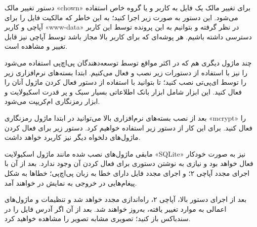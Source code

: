 دستور تغییر مالک «chown» برای تغییر مالک یک فایل به کاربر و یا گروه خاص استفاده می‌شود. این دستور به صورت زیر اجرا کنید؛ به این خاطر که مالکیت فایل را برای آپاچی و کاربر «www-data» در نظر گرفته و بتوانیم به این پرونده توسط این کاربر دسترسی داشته باشیم. هر پوشه‌ای که برای کاربر بالا مجاز باشد توسط آپاچی نیز قابل تغییر و مشاهده است.
\newline
\begin{latin}  
    
\end{latin}
چند ماژول دیگری هم که در اکثر مواقع توسط توسعه‌دهندگان پی‌اچ‌پی استفاده می‌شود را نیز با استفاده از دستورات زیر نصب و فعال می‌کنیم. ابتدا بسته‌های نرم‌افزاری زیر را توسط ای‌پی‌تی نصب کنید؛ تا بتوانید با استفاده از دستور فعال کردن ماژول آنان را فعال کنید. این ابزار شامل ابزار بانک اطلاعاتی بسیار سبک و پر قدرت اسکیو‌لایت و ابزار رمزنگاری ام‌کریپت می‌شود.
\newline
\begin{latin}  
    
\end{latin}
بعد از نصب بسته‌های نرم‌افزاری بالا می‌توانید در ابتدا ماژول رمزنگاری «mcrypt» را فعال کنید. برای این کار از دستور زیر استفاده خواهیم کرد. دستور زیر برای فعال کردن ماژول‌‌‌های دلخواه دیگر نیز کاربرد خواهد داشت.
\newline
\begin{latin}  
    
\end{latin}
مابقی ماژول‌های نصب شده مانند ماژول اسکیو‌لایت «SQLite» نیز به صورت خودکار فعال خواهد بود و نیازی به نوشتن دستوری برای فعال کردن آن وجود ندارد.  بعد از آن با اجرای مجدد آپاچی ۲؛ و اجرای مجدد فایل دارای خطا به زبان  پی‌اچ‌پی؛ خطاها به شکل پیغام‌هایی در خروجی به نمایش در خواهند آمد.
\newline
\begin{latin}  
    
\end{latin}
بعد از اجرای دستور بالا، آپاچی ۲، راه‌اندازی مجدد خواهد شد و تنظیمات و ماژول‌های اعمالی به موارد تغییر یافته، به‌روز خواهند شد. بعد از آن اگر آدرس فایل را در سند‌باکس باز کنید؛ تصویری مشابه تصویر را مشاهده خواهید کرد.
